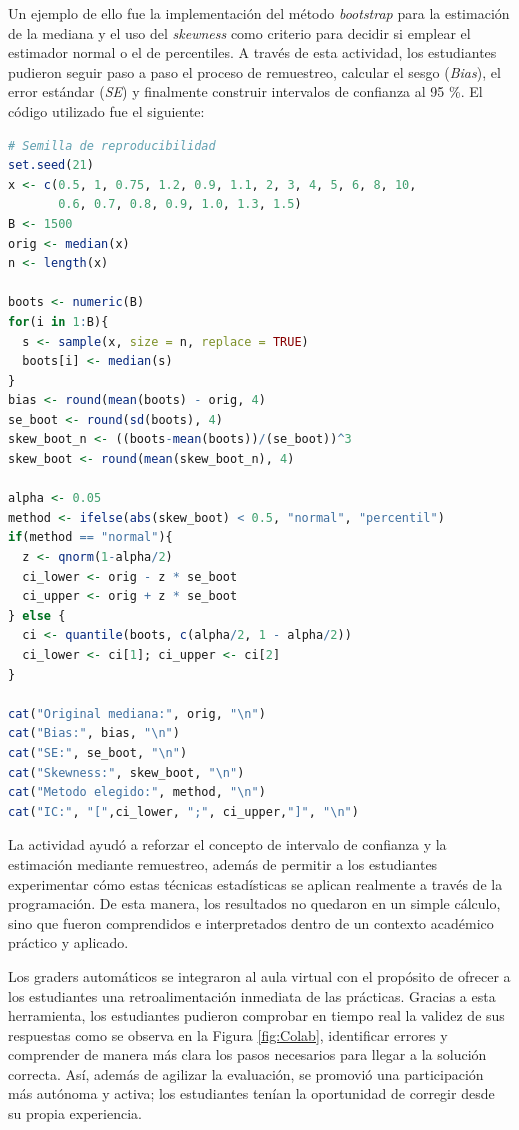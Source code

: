 \documentclass[letter,oneside,12pt,spanish]{report}
\begin{document}
Un ejemplo de ello fue la implementación del método \textit{bootstrap} para la estimación de la mediana y el uso del \textit{skewness} como criterio para decidir si emplear el estimador normal o el de percentiles. A través de esta actividad, los estudiantes pudieron seguir paso a paso el proceso de remuestreo, calcular el sesgo (\textit{Bias}), el error estándar (\textit{SE}) y finalmente construir intervalos de confianza al 95 \%. El código utilizado fue el siguiente:

\renewcommand{\lstlistingname}{Código}
\begin{lstlisting}[language=R, caption={Implementación del método Bootstrap en R}]
# Semilla de reproducibilidad
set.seed(21)
x <- c(0.5, 1, 0.75, 1.2, 0.9, 1.1, 2, 3, 4, 5, 6, 8, 10, 
       0.6, 0.7, 0.8, 0.9, 1.0, 1.3, 1.5)
B <- 1500
orig <- median(x)
n <- length(x)

boots <- numeric(B)
for(i in 1:B){
  s <- sample(x, size = n, replace = TRUE)
  boots[i] <- median(s)
}
bias <- round(mean(boots) - orig, 4)
se_boot <- round(sd(boots), 4)
skew_boot_n <- ((boots-mean(boots))/(se_boot))^3
skew_boot <- round(mean(skew_boot_n), 4)

alpha <- 0.05
method <- ifelse(abs(skew_boot) < 0.5, "normal", "percentil")
if(method == "normal"){
  z <- qnorm(1-alpha/2)
  ci_lower <- orig - z * se_boot
  ci_upper <- orig + z * se_boot
} else {
  ci <- quantile(boots, c(alpha/2, 1 - alpha/2))
  ci_lower <- ci[1]; ci_upper <- ci[2]
}

cat("Original mediana:", orig, "\n")
cat("Bias:", bias, "\n")
cat("SE:", se_boot, "\n")
cat("Skewness:", skew_boot, "\n")
cat("Metodo elegido:", method, "\n")
cat("IC:", "[",ci_lower, ";", ci_upper,"]", "\n")
\end{lstlisting}

La actividad ayudó a reforzar el concepto de intervalo de confianza y la estimación mediante remuestreo, además de permitir a los estudiantes experimentar cómo estas técnicas estadísticas se aplican realmente a través de la programación. De esta manera, los resultados no quedaron en un simple cálculo, sino que fueron comprendidos e interpretados dentro de un contexto académico práctico y aplicado.

Los graders automáticos se integraron al aula virtual con el propósito de ofrecer a los estudiantes una retroalimentación inmediata de las prácticas. Gracias a esta herramienta, los estudiantes pudieron comprobar en tiempo real la validez de sus respuestas como se observa en la Figura \ref{fig:Colab}, identificar errores y comprender de manera más clara los pasos necesarios para llegar a la solución correcta. Así, además de agilizar la evaluación, se promovió una participación más autónoma y activa; los estudiantes tenían la oportunidad de corregir desde su propia experiencia.
\end{document}
